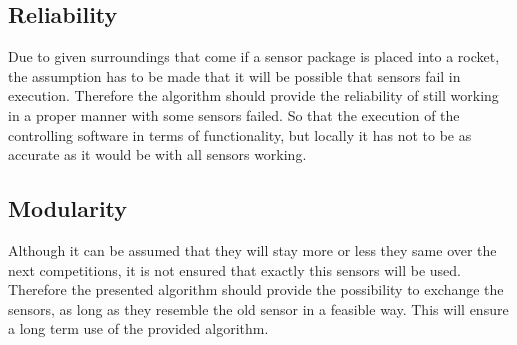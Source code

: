  \subsection{Reliability}
 Due to given surroundings that come if a sensor package is placed into a rocket, the assumption has to be made that it will be possible that sensors fail in execution.
 Therefore the algorithm should provide the reliability of still working in a proper manner with some sensors failed. So that the execution of the controlling software
 in terms of functionality, but locally it has not to be as accurate as it would be with all sensors working.

 \subsection{Modularity}
 Although it can be assumed that they will stay more or less they same over the next competitions, it is not ensured that exactly this sensors will be used.
 Therefore the presented algorithm should provide the possibility to exchange the sensors, as long as they resemble the old sensor in a feasible way.
 This will ensure a long term use of the provided algorithm.
 
